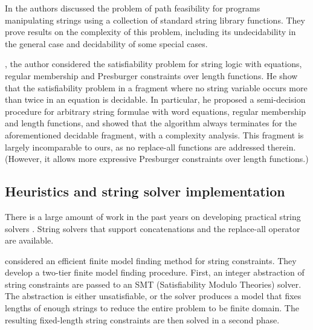 In \cite{BTV09} the authors discussed the problem of path feasibility for programs manipulating strings using a collection of standard string library functions. They prove results on the complexity of this problem, including its undecidability in the general case and decidability of some special cases. 


\cite{L16}, the author considered the satisfiability problem for string logic with equations, regular membership and Presburger constraints over length functions. %
He show that the satisfiability problem in a fragment where no string variable occurs more than twice in an equation is decidable. In particular, he proposed a semi-decision procedure for arbitrary string formulae with word equations, regular membership and length functions, and showed that the algorithm always terminates for the aforementioned decidable fragment, with a complexity analysis. 
This fragment is largely incomparable to ours, as no replace-all functions are addressed therein. (However, it allows more expressive Presburger constraints over length functions.)


\subsection*{Heuristics and string solver implementation}

There is a large amount of work in the past years on developing practical string solvers
. String solvers that support concatenations and the replace-all operator are available. \cite{BTV09, TCJ14, YABI14,TCJ16}

\cite{BTV09} considered an efficient finite model finding method for string constraints. They develop a two-tier finite model finding procedure. First, an integer abstraction of string constraints are passed to an SMT (Satisfiability Modulo Theories) solver. The abstraction is either unsatisfiable, or the solver produces a model that fixes lengths of enough strings to reduce the entire problem to be finite domain. The resulting fixed-length string constraints are then solved in a second phase. 

